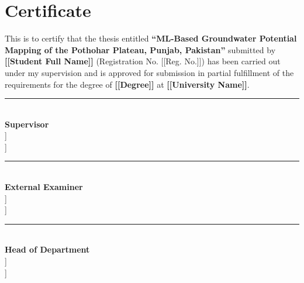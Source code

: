 \chapter*{Certificate}
\thispagestyle{plain}

\noindent
This is to certify that the thesis entitled \textbf{``ML-Based Groundwater
Potential Mapping of the Pothohar Plateau, Punjab, Pakistan''} submitted by
\textbf{[[Student Full Name]]} (Registration No. [[Reg. No.]]) has been
carried out under my supervision and is approved for submission in partial
fulfillment of the requirements for the degree of \textbf{[[Degree]]} at
\textbf{[[University Name]]}.

\vspace{2cm}

\noindent
\begin{minipage}{0.5\textwidth}
\centering
\rule{6cm}{0.4pt}\\
\textbf{Supervisor}\\
[[Supervisor Name]]\\
[[Designation, Department]]
\end{minipage}
\hfill
\begin{minipage}{0.5\textwidth}
\centering
\rule{6cm}{0.4pt}\\
\textbf{External Examiner}\\
[[Examiner Name]]\\
[[Designation, Institution]]
\end{minipage}

\vspace{2cm}

\noindent
\begin{center}
\rule{6cm}{0.4pt}\\
\textbf{Head of Department}\\
[[Name, Department]]\\
[[University Name]]
\end{center}

\cleardoublepage

